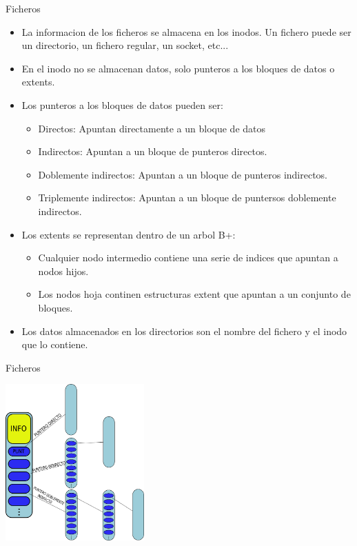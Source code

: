 \begin{frame}{Ficheros}
  \begin{itemize}
    \item La informacion de los ficheros se almacena en los inodos. Un fichero puede ser un directorio, un fichero regular, un socket, etc...
    \item En el inodo no se almacenan datos, solo punteros a los bloques de datos o extents.
    \item Los punteros a los bloques de datos pueden ser:
    \begin{itemize}
      \item Directos: Apuntan directamente a un bloque de datos
      \item Indirectos: Apuntan a un bloque de punteros directos.
      \item Doblemente indirectos: Apuntan a un bloque de punteros indirectos.
      \item Triplemente indirectos: Apuntan a un bloque de puntersos doblemente indirectos.
    \end{itemize}
    \item Los extents se representan dentro de un arbol B+:
    \begin{itemize}
      \item Cualquier nodo intermedio contiene una serie de indices que apuntan a nodos hijos.
      \item Los nodos hoja continen estructuras extent que apuntan a un conjunto de bloques.
    \end{itemize}
    \item Los datos almacenados en los directorios son el nombre del fichero y el inodo que lo contiene.
  \end{itemize}
\end{frame}

\begin{frame}{Ficheros}
  \begin{center}
    \includegraphics[height=6cm]{imgs/ext_files.png}
  \end{center}
\end{frame}

